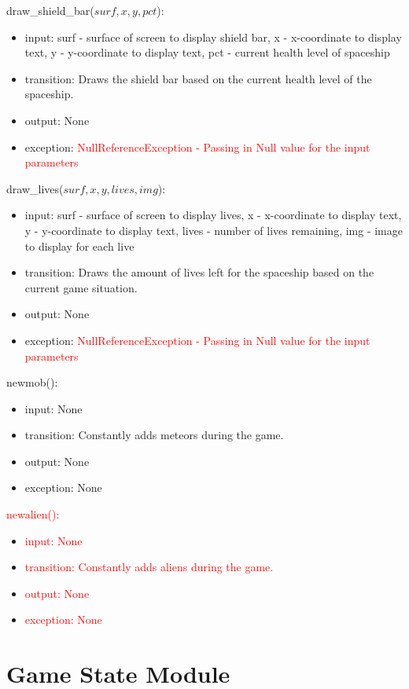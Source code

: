 \documentclass[12pt, titlepage]{article}
\begin{document}
\noindent draw\_shield\_bar($surf, x, y, pct$):
\begin{itemize}
\item input: surf - surface of screen to display shield bar, x - x-coordinate to display text, y - y-coordinate to display text, pct - current health level of spaceship
\item transition: Draws the shield bar based on the current health level of the spaceship.
\item output: None
\item exception: \textcolor{red}{NullReferenceException - Passing in Null value for the input parameters}
\end{itemize}

\noindent draw\_lives($surf, x, y, lives, img$):
\begin{itemize}
\item input: surf - surface of screen to display lives, x - x-coordinate to display text, y - y-coordinate to display text, lives - number of lives remaining, img - image to display for each live
\item transition: Draws the amount of lives left for the spaceship based on the current game situation.
\item output: None
\item exception: \textcolor{red}{NullReferenceException - Passing in Null value for the input parameters} 
\end{itemize}

\noindent newmob():
\begin{itemize}
\item input: None
\item transition: Constantly adds meteors during the game. 
\item output: None
\item exception: None
\end{itemize}

\noindent \textcolor{red}{newalien():}
\begin{itemize}
\item \textcolor{red}{input: None}
\item \textcolor{red}{transition: Constantly adds aliens during the game.}
\item \textcolor{red}{output: None}
\item \textcolor{red}{exception: None}
\end{itemize}

\newpage

\section* {Game State Module}
\end{document}
